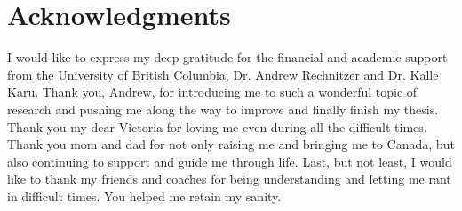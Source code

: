 
\chapter{Acknowledgments}

I would like to express my deep gratitude for the financial and academic support from the University of British Columbia, Dr. Andrew Rechnitzer and Dr. Kalle Karu. Thank you, Andrew, for introducing me to such a wonderful topic of research and pushing me along the way to improve and finally finish my thesis. Thank you my dear Victoria for loving me even during all the difficult times. Thank you mom and dad for not only raising me and bringing me to Canada, but also continuing to support and guide me through life. Last, but not least, I would like to thank my friends and coaches for being understanding and letting me rant in difficult times. You helped me retain my sanity.